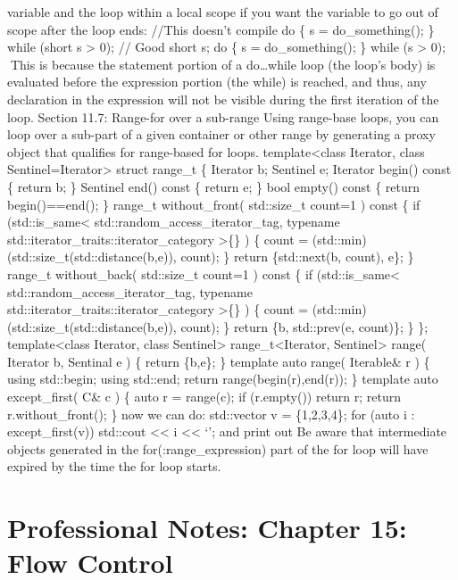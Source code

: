 variable and the loop within a local scope if you want the variable to
go out of scope after the loop ends: //This doesn't compile do \{ s =
do\_something(); \} while (short s \textgreater{} 0); // Good short s;
do \{ s = do\_something(); \} while (s \textgreater{} 0); This is
because the statement portion of a do\ldots while loop (the loop's body)
is evaluated before the expression portion (the while) is reached, and
thus, any declaration in the expression will not be visible during the
ﬁrst iteration of the loop. Section 11.7: Range-for over a sub-range
Using range-base loops, you can loop over a sub-part of a given
container or other range by generating a proxy object that qualiﬁes for
range-based for loops. template\textless class Iterator, class
Sentinel=Iterator\textgreater{} struct range\_t \{ Iterator b; Sentinel
e; Iterator begin() const \{ return b; \} Sentinel end() const \{ return
e; \} bool empty() const \{ return begin()==end(); \} range\_t
without\_front( std::size\_t count=1 ) const \{ if
(std::is\_same\textless{} std::random\_access\_iterator\_tag, typename
std::iterator\_traits::iterator\_category \textgreater\{\} ) \{ count =
(std::min)(std::size\_t(std::distance(b,e)), count); \} return
\{std::next(b, count), e\}; \} range\_t without\_back( std::size\_t
count=1 ) const \{ if (std::is\_same\textless{}
std::random\_access\_iterator\_tag, typename
std::iterator\_traits::iterator\_category \textgreater\{\} ) \{ count =
(std::min)(std::size\_t(std::distance(b,e)), count); \} return \{b,
std::prev(e, count)\}; \} \}; template\textless class Iterator, class
Sentinel\textgreater{} range\_t\textless Iterator,
Sentinel\textgreater{} range( Iterator b, Sentinal e ) \{ return
\{b,e\}; \} template auto range( Iterable\& r ) \{ using std::begin;
using std::end; return range(begin(r),end(r)); \} template auto
except\_first( C\& c ) \{ auto r = range(c); if (r.empty()) return r;
return r.without\_front(); \} now we can do: std::vector v =
\{1,2,3,4\}; for (auto i : except\_first(v)) std::cout
\textless\textless{} i \textless\textless{} `\n'; and print out Be aware
that intermediate objects generated in the for(:range\_expression) part
of the for loop will have expired by the time the for loop starts.

\hypertarget{professional-notes-chapter-15-flow-control}{%
\chapter{Professional Notes: Chapter 15: Flow
Control}\label{professional-notes-chapter-15-flow-control}}

